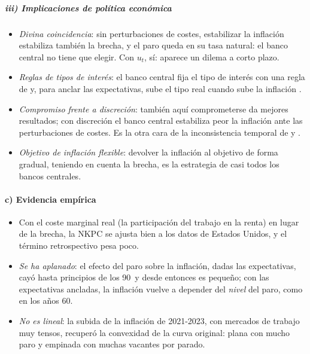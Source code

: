 \documentclass[11pt]{article}
\begin{document}
\subparagraph{iii) Implicaciones de política económica}

\begin{itemize}
\item \emph{Divina coincidencia}: sin perturbaciones de costes, estabilizar la inflación estabiliza también la brecha, y el paro queda en su tasa natural: el banco central no tiene que elegir\nocite{BlanchardGali2007Real}. Con $u_t$, sí: aparece un dilema a corto plazo.
\item \emph{Reglas de tipos de interés}: el banco central fija el tipo de interés con una regla de \nocite{Taylor1993} y, para anclar las expectativas, sube el tipo real cuando sube la inflación .
\item \emph{Compromiso frente a discreción}: también aquí comprometerse da mejores resultados; con discreción el banco central estabiliza peor la inflación ante las perturbaciones de costes\nocite{ClaridaGaliGertler1999Science}. Es la otra cara de la inconsistencia temporal de  y .
\item \emph{Objetivo de inflación flexible}: devolver la inflación al objetivo de forma gradual, teniendo en cuenta la brecha, es la estrategia de casi todos los bancos centrales.
\end{itemize}

\paragraph{c) Evidencia empírica}

\begin{itemize}
\item Con el coste marginal real (la participación del trabajo en la renta) en lugar de la brecha, la NKPC se ajusta bien a los datos de Estados Unidos, y el término retrospectivo pesa poco\nocite{GaliGertler1999Inflation}.
\item \emph{Se ha aplanado}: el efecto del paro sobre la inflación, dadas las expectativas, cayó hasta principios de los 90~y desde entonces es pequeño\nocite{BlanchardCeruttiSummers2015Inflation}; con las expectativas ancladas, la inflación vuelve a depender del \emph{nivel} del paro, como en los años 60\nocite{Blanchard2016Phillips}.
\item \emph{No es lineal}: la subida de la inflación de 2021-2023, con mercados de trabajo muy tensos, recuperó la convexidad de la curva original: plana con mucho paro y empinada con muchas vacantes por parado\nocite{BenignoEggertsson2023}.
\end{itemize}
\end{document}
